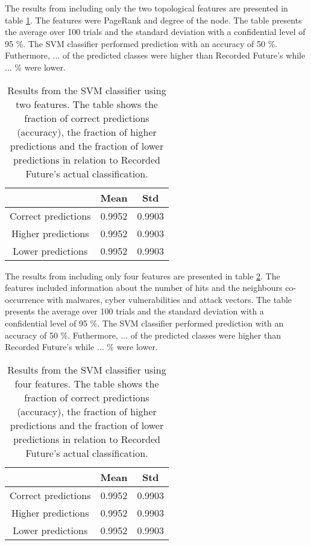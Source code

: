 The results from including only the two topological features are presented in table \ref{IpRes2Feat}. The features were PageRank and degree of the node. The table presents the average over 100 trials and the standard deviation with a confidential level of 95 \%. The SVM classifier performed prediction with an accuracy of 50 \%. Futhermore, ... of the predicted classes were higher than Recorded Future's while ... \% were lower. 

\begin{table}[h!]
    \centering
    \caption{Results from the SVM classifier using two features. The table shows the fraction of correct predictions (accuracy), the fraction of higher predictions and the fraction of lower predictions in relation to Recorded Future's actual classification.}
    \begin{tabular}{|c|c|c|}
    \hline
        ~   & Mean & Std  \\ \hline
        Correct predictions & 0.9952 &  0.9903 \\
        Higher predictions  & 0.9952 &  0.9903\\
        Lower predictions   & 0.9952 &  0.9903\\ \hline
    \end{tabular}
    \label{IpRes2Feat}
\end{table}

The results from including only four features are presented in table \ref{IpRes4Feat}. The features included information about the number of hits and the neighbours co-occurrence with malwares, cyber vulnerabilities and attack vectors. The table presents the average over 100 trials and the standard deviation with a confidential level of 95 \%. The SVM classifier performed prediction with an accuracy of 50 \%. Futhermore, ... of the predicted classes were higher than Recorded Future's while ... \% were lower. 

\begin{table}[h!]
    \centering
    \caption{Results from the SVM classifier using four features. The table shows the fraction of correct predictions (accuracy), the fraction of higher predictions and the fraction of lower predictions in relation to Recorded Future's actual classification.}
    \begin{tabular}{|c|c|c|}
    \hline
        ~   & Mean & Std  \\ \hline
        Correct predictions & 0.9952 &  0.9903 \\
        Higher predictions  & 0.9952 &  0.9903\\
        Lower predictions   & 0.9952 &  0.9903\\ \hline
    \end{tabular}
    \label{IpRes4Feat}
\end{table}

